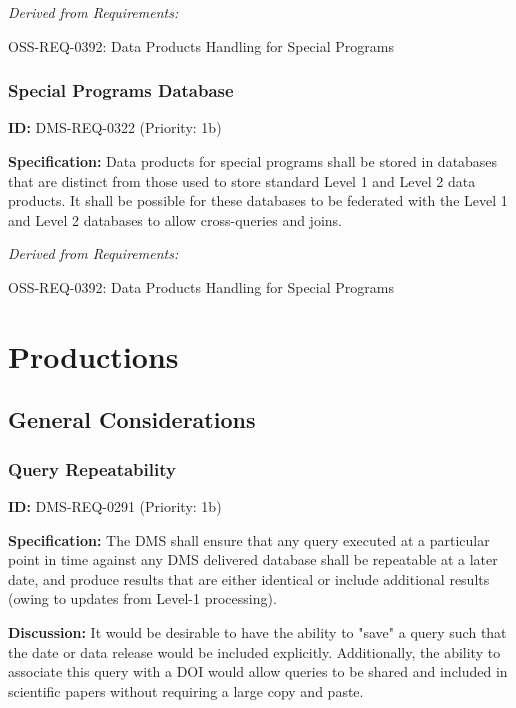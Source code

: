 \documentclass[SE,toc,lsstdraft]{lsstdoc}
\begin{document}
\emph{Derived from Requirements:}

OSS-REQ-0392:
Data Products Handling for Special Programs \newline

\subsubsection{Special Programs Database}

\label{DMS-REQ-0322}
\textbf{ID:} DMS-REQ-0322 (Priority: 1b)

\textbf{Specification:} Data products for special programs shall be stored in databases that are distinct from those used to store standard Level 1 and Level 2 data products. It shall be possible for these databases to be federated with the Level 1 and Level 2 databases to allow cross-queries and joins.

\emph{Derived from Requirements:}

OSS-REQ-0392:
Data Products Handling for Special Programs \newline

\section{Productions}

\subsection{General Considerations}

\subsubsection{Query Repeatability}

\label{DMS-REQ-0291}
\textbf{ID:} DMS-REQ-0291 (Priority: 1b)

\textbf{Specification:} The DMS shall ensure that any query executed at a particular point in time against any DMS delivered database shall be repeatable at a later date, and produce results that are either identical or include additional results (owing to updates from Level-1 processing).

\textbf{Discussion:} It would be desirable to have the ability to "save" a query such that the date or data release would be included explicitly. Additionally, the ability to associate this query with a DOI would allow queries to be shared and included in scientific papers without requiring a large copy and paste.
\end{document}
